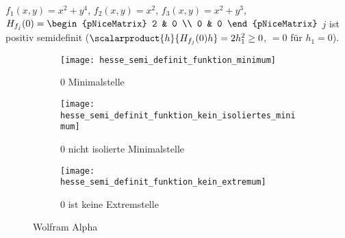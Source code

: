 \begin{beispiel*}
  \( f_1(x,y)=x^2+y^4 \), \( f_2(x,y)=x^2 \), \( f_3(x,y)=x^2+y^3 \), \( H_{f_j}(0)=\begin{pNiceMatrix} 2 & 0 \\ 0 & 0 \end{pNiceMatrix} \) \tforall \( j \) ist positiv semidefinit (\( \scalarproduct{h}{H_{f_j}(0)h}=2h_1^2\geq 0 \), \( =0 \) für \( h_1=0 \)).
  \begin{figure}[H]
    \centering
    \begin{subfigure}[b]{0.3\textwidth}
      \centering
      \texttt{[image: hesse\_semi\_definit\_funktion\_minimum]}
      \caption*{\( 0 \) Minimalstelle}
    \end{subfigure}
    \begin{subfigure}[b]{0.3\textwidth}
      \centering
      \texttt{[image: hesse\_semi\_definit\_funktion\_kein\_isoliertes\_minimum]}
      \caption*{\( 0 \) nicht isolierte Minimalstelle}
    \end{subfigure}
    \begin{subfigure}[b]{0.3\textwidth}
      \centering
      \texttt{[image: hesse\_semi\_definit\_funktion\_kein\_extremum]}
      \caption*{\( 0 \) ist keine Extremstelle}
    \end{subfigure}
    \caption{Wolfram Alpha}
  \end{figure}
\end{beispiel*}
